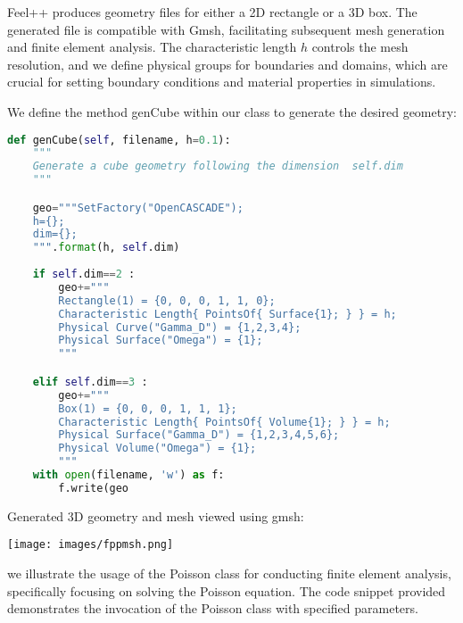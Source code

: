\documentclass[12pt]{article}
\begin{document}
Feel++ produces geometry files for either a 2D rectangle or a 3D box. The generated file is compatible with Gmsh, facilitating subsequent mesh generation and finite element analysis. The characteristic length $h$ controls the mesh resolution, and we define physical groups for boundaries and domains, which are crucial for setting boundary conditions and material properties in simulations. 
\newline

We define the method genCube within our class to generate the desired geometry:
\begin{lstlisting}[language=Python,caption={},frame=single, backgroundcolor=\color{gray!10}, basicstyle=\footnotesize,rulecolor=\color{blue}, framexleftmargin=3pt, commentstyle=\color{mygreen}, keywordstyle=\color{blue}]
def genCube(self, filename, h=0.1):
    """
    Generate a cube geometry following the dimension  self.dim
    """

    geo="""SetFactory("OpenCASCADE");
    h={};
    dim={};
    """.format(h, self.dim)
    
    if self.dim==2 :
        geo+="""
        Rectangle(1) = {0, 0, 0, 1, 1, 0};
        Characteristic Length{ PointsOf{ Surface{1}; } } = h;
        Physical Curve("Gamma_D") = {1,2,3,4};
        Physical Surface("Omega") = {1};
        """

    elif self.dim==3 :
        geo+="""
        Box(1) = {0, 0, 0, 1, 1, 1};
        Characteristic Length{ PointsOf{ Volume{1}; } } = h;
        Physical Surface("Gamma_D") = {1,2,3,4,5,6};
        Physical Volume("Omega") = {1};
        """
    with open(filename, 'w') as f:
        f.write(geo
\end{lstlisting}


\newpage

Generated 3D geometry and mesh viewed using gmsh:

\begin{frame}{}
    \begin{center}
        \texttt{[image: images/fppmsh.png]}
    \end{center}
\end{frame}


 we illustrate the usage of the Poisson class for conducting finite element analysis, specifically focusing on solving the Poisson equation. The code snippet provided demonstrates the invocation of the Poisson class with specified parameters.
\newline
\end{document}

